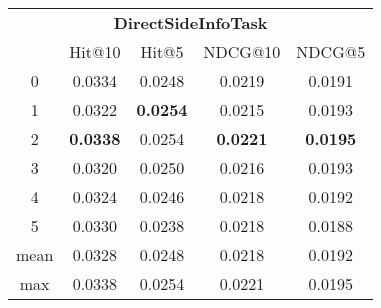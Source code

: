 \documentclass{article}
\begin{document}
 

\begin{tabular}{c|cccc}

\multicolumn{5}{c}{\textbf{DirectSideInfoTask}} \\
\noalign{\smallskip}
\noalign{\smallskip}
\toprule
\multicolumn{1}{c}{Template ID} & \multicolumn{1}{|c}{Hit@10} & \multicolumn{1}{c}{Hit@5} & \multicolumn{1}{c}{NDCG@10} & \multicolumn{1}{c}{NDCG@5} \\
\midrule
0 & 0.0334 & 0.0248 & 0.0219 & 0.0191 \\
1 & 0.0322 & \textbf{0.0254} & 0.0215 & 0.0193 \\
2 & \textbf{0.0338} & 0.0254 & \textbf{0.0221} & \textbf{0.0195} \\
3 & 0.0320 & 0.0250 & 0.0216 & 0.0193 \\
4 & 0.0324 & 0.0246 & 0.0218 & 0.0192 \\
5 & 0.0330 & 0.0238 & 0.0218 & 0.0188 \\
\midrule
mean & 0.0328 & 0.0248 & 0.0218 & 0.0192 \\
max & 0.0338 & 0.0254 & 0.0221 & 0.0195 \\
\bottomrule

\end{tabular}
\end{document}
